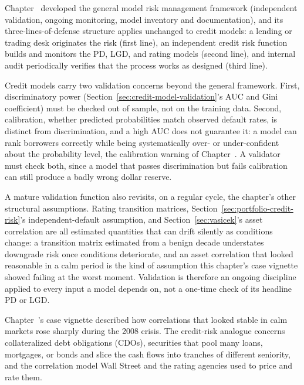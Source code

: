 \documentclass[../ai_in_finance]{subfiles}
\begin{document}
Chapter~ developed the general model risk management framework (independent validation, ongoing monitoring, model inventory and documentation), and its three-lines-of-defense structure applies unchanged to credit models: a lending or trading desk originates the risk (first line), an independent credit risk function builds and monitors the PD, LGD, and rating models (second line), and internal audit periodically verifies that the process works as designed (third line).

Credit models carry two validation concerns beyond the general framework. First, discriminatory power (Section~\ref{sec:credit-model-validation}'s AUC and Gini coefficient) must be checked out of sample, not on the training data.
Second, calibration, whether predicted probabilities match observed default rates, is distinct from discrimination, and a high AUC does not guarantee it: a model can rank borrowers correctly while being systematically over- or under-confident about the probability level, the calibration warning of Chapter~. A validator must check both, since a model that passes discrimination but fails calibration can still produce a badly wrong dollar reserve.

A mature validation function also revisits, on a regular cycle, the chapter's other structural assumptions. Rating transition matrices, Section~\ref{sec:portfolio-credit-risk}'s independent-default assumption, and Section~\ref{sec:vasicek}'s asset correlation are all estimated quantities that can drift silently as conditions change: a transition matrix estimated from a benign decade understates downgrade risk once conditions deteriorate, and an asset correlation that looked reasonable in a calm period is the kind of assumption this chapter's case vignette showed failing at the worst moment.
Validation is therefore an ongoing discipline applied to every input a model depends on, not a one-time check of its headline PD or LGD.


Chapter~'s case vignette described how correlations that looked stable in calm markets rose sharply during the 2008 crisis. The credit-risk analogue concerns collateralized debt obligations (CDOs), securities that pool many loans, mortgages, or bonds and slice the cash flows into tranches of different seniority, and the correlation model Wall Street and the rating agencies used to price and rate them.
\end{document}
